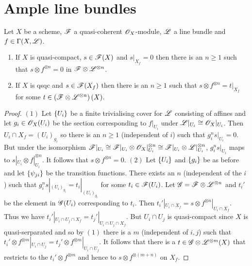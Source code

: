 \documentclass{memoir}
\begin{document}
\section{Ample line bundles}
\begin{lemma}
    \label{lem:ext}
    Let $X$ be a scheme, $\mathscr{F}$ a quasi-coherent $\mathscr{O}_X$-module, $\mathscr{L}$ a line bundle and $f\in \Gamma(X,\mathscr{L})$.
    \begin{enumerate}
        \item If $X$ is quasi-compact, $s\in \mathscr{F}(X)$ and $s|_{X_f} = 0$ then there is an $n\ge1$ such that $s\otimes f^{\otimes n} = 0$ in $\mathscr{F} \otimes \mathscr{L}^{\otimes n}$.
        \item If $X$ is qsqc and $s\in \mathscr{F}(X_f)$ then there is an $n\ge1$ such that $s\otimes f^{\otimes n} = t|_{X_f}$ for some $t\in \left(\mathscr{F}\otimes \mathscr{L}^{\otimes n}\right)(X)$.
    \end{enumerate}
\end{lemma}
\begin{proof}
    $(1)$ Let $\lbrace U_i\rbrace$ be a finite trivialising cover for $\mathscr{L}$ consisting of affines and let $g_i\in \mathscr{O}_X(U_i)$ be the section corresponding to $f|_{U_i}$ under $\mathscr{L}|_{U_i} \cong \mathscr{O}_X|_{U_i}$.
    Then $U_i\cap X_f = (U_i)_{g_i}$ so there is an $n\ge1$ (independent of $i$) such that $g_i^ns|_{U_i} = 0$.
    But under the isomorphism $\mathscr{F}|_{U_i} \cong \mathscr{F}|_{U_i}\otimes \mathscr{O}_X|_{U_i}^{\otimes n}\cong \mathscr{F}|_{U_i}\otimes \mathscr{L}|_{U_i}^{\otimes n}$, $g_i^ns|_{U_i}$ maps to $s|_{U_i}\otimes f|_{U_i}^{\otimes n}$.
    It follows that $s\otimes f^{\otimes n} = 0$.
    $(2)$ Let $\lbrace U_i\rbrace$ and $\lbrace g_i\rbrace$ be as before and let $\lbrace\psi_{ji}\rbrace$ be the transition functions.
    There exists an $n$ (independent of the $i$) such that $g_i^ns|_{(U_i)_{g_i}} = t_i|_{(U_i)_{g_i}}$ for some $t_i\in \mathscr{F}(U_i)$.
    Let $\mathscr{G} = \mathscr{F}\otimes \mathscr{L}^{\otimes n}$ and $t_i'$ be the element in $\mathscr{G}(U_i)$ corresponding to $t_i$. 
    Then $t_i'|_{U_i\cap X_f} = s\otimes f^{\otimes n}|_{U_i\cap X_f}$.
    Thus we have $t_i'|_{U_i\cap U_j\cap X_f} = t_j'|_{U_i\cap U_j\cap X_f}$.
    But $U_i\cap U_j$ is quasi-compact since $X$ is quasi-serparated and so by $(1)$ there is a $m$ (independent of $i,j$) such that $t_i'\otimes f^{\otimes m}|_{U_i\cap U_j} = t_j'\otimes f^{\otimes m}|_{U_i\cap U_j}$.
    It follows that there is a $t\in \mathscr{G}\otimes \mathscr{L}^{\otimes m}(X)$ that restricts to the $t_i'\otimes f^{\otimes m}$ and hence to $s\otimes f^{\otimes(m+n)}$ on $X_f$.
\end{proof}
\end{document}
